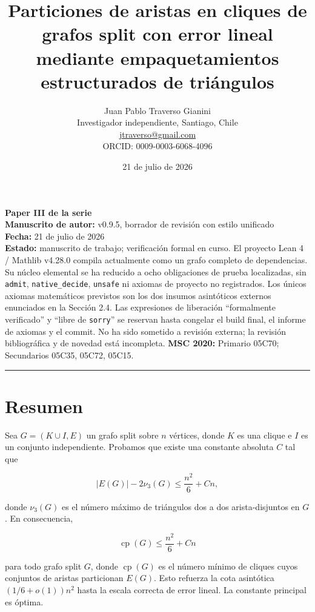 \documentclass[
  11pt,
]{article}
\title{Particiones de aristas en cliques de grafos split con error lineal mediante empaquetamientos estructurados de triángulos}
\author{Juan Pablo Traverso Gianini\\
\small Investigador independiente, Santiago, Chile\\
\small \href{mailto:jtraverso@gmail.com}{jtraverso@gmail.com}\\
\small ORCID: 0009-0003-6068-4096}
\date{21 de julio de 2026}
\begin{document}
\sloppy
\maketitle
\begin{small}\begin{raggedright}

\textbf{Paper III de la serie}\\
\textbf{Manuscrito de autor:} v0.9.5, borrador de revisión con estilo unificado\\
\textbf{Fecha:} 21 de julio de 2026\\
\textbf{Estado:} manuscrito de trabajo; verificación formal en curso. El proyecto Lean 4 / Mathlib v4.28.0 compila actualmente como un grafo completo de dependencias. Su núcleo elemental se ha reducido a ocho obligaciones de prueba localizadas, sin \texttt{admit}, \texttt{native\_decide}, \texttt{unsafe} ni axiomas de proyecto no registrados. Los únicos axiomas matemáticos previstos son los dos insumos asintóticos externos enunciados en la Sección 2.4. Las expresiones de liberación ``formalmente verificado'' y ``libre de \texttt{sorry}'' se reservan hasta congelar el build final, el informe de axiomas y el commit. No ha sido sometido a revisión externa; la revisión bibliográfica y de novedad está incompleta. \textbf{MSC 2020:} Primario 05C70; Secundarios 05C35, 05C72, 05C15.

\begin{center}\rule{0.5\linewidth}{0.5pt}\end{center}

\end{raggedright}\end{small}

\section{Resumen}\label{resumen}

Sea \(G=(K\cup I,E)\) un grafo split sobre \(n\) vértices, donde \(K\)
es una clique e \(I\) es un conjunto independiente. Probamos que existe
una constante absoluta \(C\) tal que

\[
|E(G)|-2\nu_3(G)
\le
\frac{n^2}{6}+Cn,
\]

donde \(\nu_3(G)\) es el número máximo de triángulos dos a dos
arista-disjuntos en \(G\). En consecuencia,

\[
\operatorname{cp}(G)
\le
\frac{n^2}{6}+Cn
\]

para todo grafo split \(G\), donde \(\operatorname{cp}(G)\) es el número
mínimo de cliques cuyos conjuntos de aristas particionan \(E(G)\). Esto
refuerza la cota asintótica \((1/6+o(1))n^2\) hasta la escala correcta
de error lineal. La constante principal es óptima.
\end{document}

